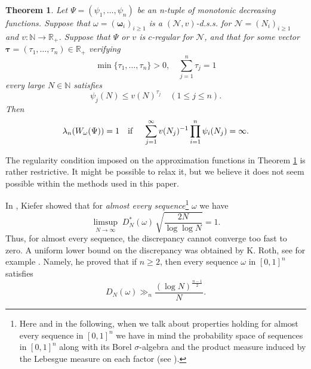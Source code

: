 \documentclass{amsart}
\newtheorem{theorem}{Theorem}[section]
\theoremstyle{definition}
\newcommand{\N}{\mathbb N}%
\newcommand{\R}{\mathbb R}
\newcommand{\0}{\mbf 0}%
\newcommand{\cN}{{\mathcal N}}
\renewcommand{\text}{\textup}
\def\N{\mathbb N}
\def\R{\mathbb R}
\begin{document}
\begin{theorem} \label{uniform khintchine}
Let $\Psi=(\psi_{1},\dots,\psi_{n})$ be an n-tuple of monotonic decreasing functions. Suppose that $\omega=( \boldsymbol{\omega}_{i} )_{i\geq 1}$ is a $(\cN,v)$-d.s.s. for $\cN=(  N_{i} )_{i\geq 1}$ and $v:\N\to \R_{+}$. Suppose that $\Psi$ or $v$ is $c$-regular for $\cN$, and that for some vector $\boldsymbol{\tau} =(\tau_1,\ldots,\tau_n)\in\R_+$ verifying
\[
\min\{\tau_1,\ldots, \tau_n\}>0,\quad 
\sum_{j=1}^n \tau_j = 1
\]
every large $N\in\N$ satisfies
\[
\psi_j(N)\leq v(N)^{\tau_j}
\quad
(1\leq j\leq n).
\]
Then
\begin{equation*}
    \lambda_n(W_{\omega}(\Psi))=1 \quad \text{\rm if }\quad \sum_{j=1}^{\infty} v(N_{j})^{-1}\prod_{i=1}^{n}\psi_{i}(N_{j}) = \infty.
\end{equation*}
\end{theorem}

The regularity condition imposed on the approximation functions in Theorem \ref{uniform khintchine} is rather restrictive. It might be possible to relax it, but we believe it does not seem possible within the methods used in this paper.

In \cite{Kiefer1961}, Kiefer showed that for \textit{almost every sequence}\footnote{Here and in the following, when we talk about properties holding for almost every sequence in $[0,1]^n$ we have in mind the probability space of sequences in $[0,1]^n$ along with its Borel $\sigma$-algebra and the product measure induced by the Lebesgue measure on each factor (see \cite[Theorem 8.23]{Kallenberg2021}).} $\omega$ we have
\begin{equation}\label{EQ:Kiefer}
\limsup_{N\to\infty} \;  D_N^*(\omega)\,\sqrt{\frac{2N}{\log\log N}} = 1.
\end{equation}
 Thus, for almost every sequence, the discrepancy cannot converge too fast to zero. A uniform lower bound on the discrepancy was obtained by K. Roth, see for example \cite[Ch. 2 Theorem 2.1]{KuipersNiederreiter1974}. Namely, he proved that if $n\geq2$, then every sequence $\omega$ in $[0,1]^n$ satisfies
\begin{equation}\label{Eq:RothDiscrepancyLowerEstimate}
D_N(\omega)
\gg_n
\frac{(\log N)^{\frac{n-1}{2}}}{N}.
\end{equation}
\end{document}
